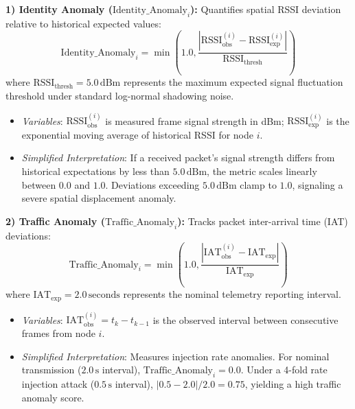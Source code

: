 \documentclass[conference]{IEEEtran}
\begin{document}
\textbf{1) Identity Anomaly ($\text{Identity\_Anomaly}_i$):} Quantifies spatial RSSI deviation relative to historical expected values:
\begin{equation}
\label{eq_identity_anomaly}
\text{Identity\_Anomaly}_i = \min\left(1.0, \frac{\left| \text{RSSI}_{\text{obs}}^{(i)} - \text{RSSI}_{\text{exp}}^{(i)} \right|}{\text{RSSI}_{\text{thresh}}}\right)
\end{equation}
where $\text{RSSI}_{\text{thresh}} = 5.0\,\text{dBm}$ represents the maximum expected signal fluctuation threshold under standard log-normal shadowing noise.
\begin{itemize}
    \item \textit{Variables}: $\text{RSSI}_{\text{obs}}^{(i)}$ is measured frame signal strength in dBm; $\text{RSSI}_{\text{exp}}^{(i)}$ is the exponential moving average of historical RSSI for node $i$.
    \item \textit{Simplified Interpretation}: If a received packet's signal strength differs from historical expectations by less than $5.0\,\text{dBm}$, the metric scales linearly between $0.0$ and $1.0$. Deviations exceeding $5.0\,\text{dBm}$ clamp to $1.0$, signaling a severe spatial displacement anomaly.
\end{itemize}

\textbf{2) Traffic Anomaly ($\text{Traffic\_Anomaly}_i$):} Tracks packet inter-arrival time (IAT) deviations:
\begin{equation}
\label{eq_traffic_anomaly}
\text{Traffic\_Anomaly}_i = \min\left(1.0, \frac{\left| \text{IAT}_{\text{obs}}^{(i)} - \text{IAT}_{\text{exp}} \right|}{\text{IAT}_{\text{exp}}}\right)
\end{equation}
where $\text{IAT}_{\text{exp}} = 2.0\,\text{seconds}$ represents the nominal telemetry reporting interval.
\begin{itemize}
    \item \textit{Variables}: $\text{IAT}_{\text{obs}}^{(i)} = t_k - t_{k-1}$ is the observed interval between consecutive frames from node $i$.
    \item \textit{Simplified Interpretation}: Measures injection rate anomalies. For nominal transmission ($2.0\,\text{s}$ interval), $\text{Traffic\_Anomaly}_i = 0.0$. Under a 4-fold rate injection attack ($0.5\,\text{s}$ interval), $|0.5 - 2.0| / 2.0 = 0.75$, yielding a high traffic anomaly score.
\end{itemize}
\end{document}
